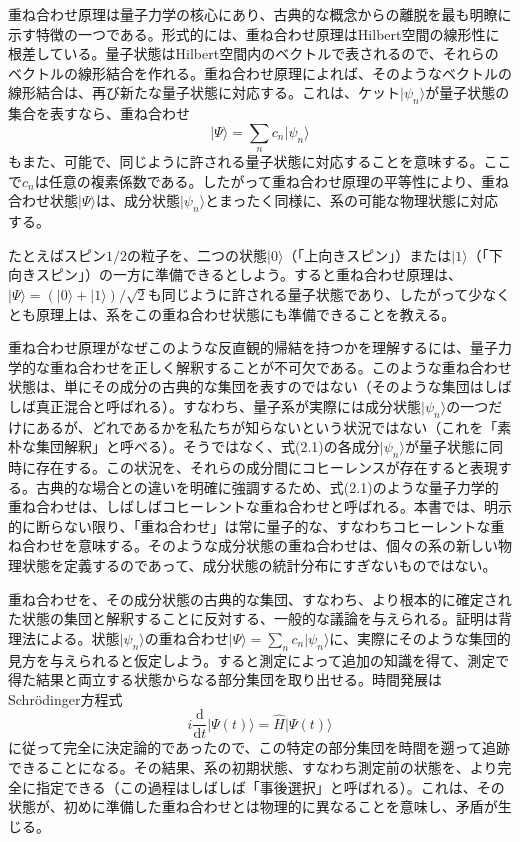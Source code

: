 \hypertarget{srcpage:20}{}\label{srcpage:20}
重ね合わせ原理は量子力学の核心にあり、古典的な概念からの離脱を最も明瞭に示す特徴の一つである。形式的には、重ね合わせ原理はHilbert空間の線形性に根差している。量子状態はHilbert空間内のベクトルで表されるので、それらのベクトルの線形結合を作れる。重ね合わせ原理によれば、そのようなベクトルの線形結合は、再び新たな量子状態に対応する。これは、ケット$\lvert\psi_n\rangle$が量子状態の集合を表すなら、重ね合わせ
\begin{equation}\lvert\Psi\rangle=\sum_n c_n\lvert\psi_n\rangle\tag{2.1}\end{equation}
もまた、可能で、同じように許される量子状態に対応することを意味する。ここで$c_n$は任意の複素係数である。したがって重ね合わせ原理の平等性により、重ね合わせ状態$\lvert\Psi\rangle$は、成分状態$\lvert\psi_n\rangle$とまったく同様に、系の可能な物理状態に対応する。

たとえばスピン$1/2$の粒子を、二つの状態$\lvert0\rangle$（「上向きスピン」）または$\lvert1\rangle$（「下向きスピン」）の一方に準備できるとしよう。すると重ね合わせ原理は、$\lvert\Psi\rangle=(\lvert0\rangle+\lvert1\rangle)/\sqrt2$も同じように許される量子状態であり、したがって少なくとも原理上は、系をこの重ね合わせ状態にも準備できることを教える。

重ね合わせ原理がなぜこのような反直観的帰結を持つかを理解するには、量子力学的な重ね合わせを正しく解釈することが不可欠である。このような重ね合わせ状態は、単にその成分の古典的な集団を表すのではない（そのような集団はしばしば真正混合と呼ばれる\cite{ref047,ref048,ref049}）。すなわち、量子系が実際には成分状態$\lvert\psi_n\rangle$の一つだけにあるが、どれであるかを私たちが知らないという状況ではない（これを「素朴な集団解釈」と呼べる）。そうではなく、式(2.1)の各成分$\lvert\psi_n\rangle$が量子状態に同時に存在する。この状況を、それらの成分間にコヒーレンスが存在すると表現する。古典的な場合との違いを明確に強調するため、式(2.1)のような量子力学的重ね合わせは、しばしばコヒーレントな重ね合わせと呼ばれる。本書では、明示的に断らない限り、「重ね合わせ」は常に量子的な、すなわちコヒーレントな重ね合わせを意味する。そのような成分状態の重ね合わせは、個々の系の新しい物理状態を定義するのであって、成分状態の統計分布にすぎないものではない。

\hypertarget{srcpage:21}{}\label{srcpage:21}
重ね合わせを、その成分状態の古典的な集団、すなわち、より根本的に確定された状態の集団と解釈することに反対する、一般的な議論を与えられる。証明は背理法による。状態$\lvert\psi_n\rangle$の重ね合わせ$\lvert\Psi\rangle=\sum_n c_n\lvert\psi_n\rangle$に、実際にそのような集団的見方を与えられると仮定しよう。すると測定によって追加の知識を得て、測定で得た結果と両立する状態からなる部分集団を取り出せる。時間発展はSchrödinger方程式
\begin{equation}i\frac{\mathrm d}{\mathrm dt}\lvert\Psi(t)\rangle=\hat H\lvert\Psi(t)\rangle\tag{2.2}\end{equation}
に従って完全に決定論的であったので、この特定の部分集団を時間を遡って追跡できることになる。その結果、系の初期状態、すなわち測定前の状態を、より完全に指定できる（この過程はしばしば「事後選択」と呼ばれる\cite{ref050}）。これは、その状態が、初めに準備した重ね合わせとは物理的に異なることを意味し、矛盾が生じる。

